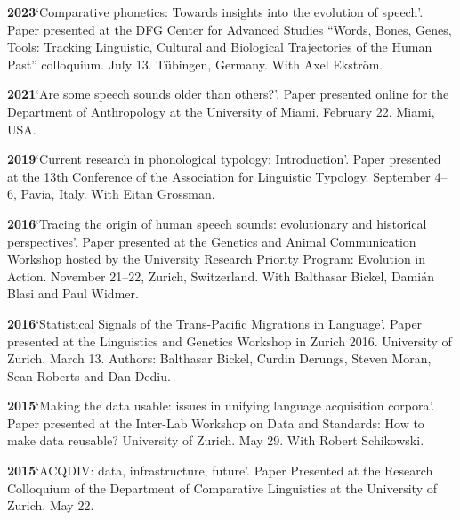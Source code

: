 \documentclass[11pt]{article}
\newcommand{\hangpara}{
 \setlength{\parindent}{0in} %
 \hangindent=0.42in %
}
\begin{document}
\hangpara
\vskip 6pt
{\bf 2023}\hspace{1ex}`Comparative phonetics: Towards insights into the evolution of speech'. Paper presented at the DFG Center for Advanced Studies ``Words, Bones, Genes, Tools: Tracking Linguistic, Cultural and Biological Trajectories of the Human Past'' colloquium. July 13. Tübingen, Germany. With Axel Ekström. %

\hangpara
\vskip 6pt
{\bf 2021}\hspace{1ex}`Are some speech sounds older than others?'. Paper presented online for the Department of Anthropology at the University of Miami. February 22. Miami, USA.

\hangpara
\vskip 6pt
{\bf 2019}\hspace{1ex}`Current research in phonological typology: Introduction'. Paper presented at the 13th Conference of the Association for Linguistic Typology. September 4--6, Pavia, Italy. With Eitan Grossman.

\hangpara
\vskip 6pt
{\bf 2016}\hspace{1ex}`Tracing the origin of human speech sounds: evolutionary and historical perspectives'. Paper presented at the Genetics and Animal Communication Workshop hosted by the University Research Priority Program: Evolution in Action. November 21--22, Zurich, Switzerland. With Balthasar Bickel, Dami{\'a}n Blasi and Paul Widmer.

\hangpara
\vskip 6pt
{\bf 2016}\hspace{1ex}`Statistical Signals of the Trans-Pacific Migrations in Language'. Paper presented at the Linguistics and Genetics Workshop in Zurich 2016. University of Zurich. March 13. Authors: Balthasar Bickel, Curdin Derungs, Steven Moran, Sean Roberts and Dan Dediu.

\hangpara
\vskip 6pt
{\bf 2015}\hspace{1ex}`Making the data usable: issues in unifying language acquisition corpora'. Paper presented at the Inter-Lab Workshop on Data and Standards: How to make data reusable? University of Zurich. May 29. With Robert Schikowski.

\vskip 6pt
\hangpara
{\bf 2015}\hspace{1ex}`ACQDIV: data, infrastructure, future'. Paper Presented at the Research Colloquium of the Department of Comparative Linguistics at the University of Zurich. May 22.
\end{document}
